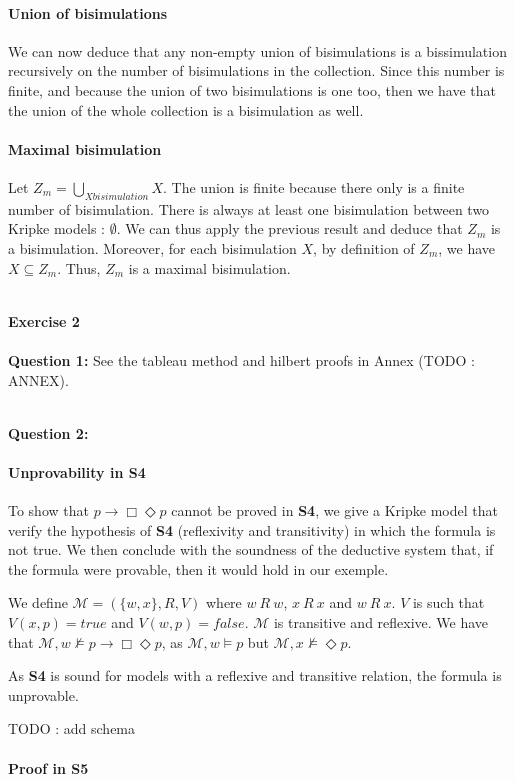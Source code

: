 \documentclass[10pt]{article}
\def\exercise#1{\ \vspace{1cm}\\\Large\textbf{Exercise #1}\normalsize\\}
\def\question#1{\ \vspace{1cm}\\\textbf{Question #1:}\quad}
\def\M{\mathcal{M}}
\begin{document}
\paragraph{Union of bisimulations} We can now deduce that any non-empty union of bisimulations is a bissimulation recursively on the number of bisimulations in the collection. Since this number is finite, and because the union of two bisimulations is one too, then we have that the union of the whole collection is a bisimulation as well.

\paragraph{Maximal bisimulation} Let $Z_m = \underset{X \mathit{bisimulation}}{\bigcup} X$. The union is finite because there only is a finite number of bisimulation. There is always at least one bisimulation between two Kripke models : $\emptyset$. We can thus apply the previous result and deduce that $Z_m$ is a bisimulation. Moreover, for each bisimulation $X$, by definition of $Z_m$, we have $X\subseteq Z_m$. Thus, $Z_m$ is a maximal bisimulation.



\exercise{2}
\question{1}
See the tableau method and hilbert proofs in Annex (TODO : ANNEX).



\question{2}
\paragraph{Unprovability in \textbf{S4}} To show that $p\rightarrow\Box\Diamond p$ cannot be proved in \textbf{S4}, we give a Kripke model that verify the hypothesis of \textbf{S4} (reflexivity and transitivity) in which the formula is not true. We then conclude with the soundness of the deductive system that, if the formula were provable, then it would hold in our exemple.

We define $\M=(\{w,x\},R,V)$ where $w\ R\ w$, $x\ R\ x$ and $w\ R\ x$. $V$ is such that $V(x,p)=\mathit{true}$ and $V(w,p)=\mathit{false}$. $\M$ is transitive and reflexive. We have that $\M,w\not\models p\rightarrow\Box\Diamond p$, as $\M,w\models p$ but $\M,x\not\models\Diamond p$.

As \textbf{S4} is sound for models with a reflexive and transitive relation, the formula is unprovable.

TODO : add schema

\paragraph{Proof in \textbf{S5}} 
\end{document}
